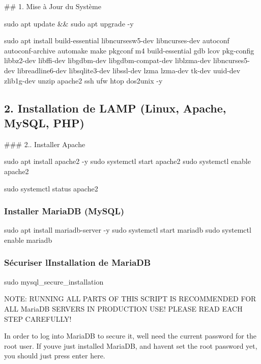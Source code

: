 \#\# 1. Mise à Jour du Système 
\begin{DoxyCode}
sudo apt update && sudo apt upgrade -y

sudo apt install build-essential libncursesw5-dev libncurses-dev autoconf autoconf-archive automake make
       pkgconf m4 build-essential gdb lcov pkg-config   libbz2-dev libffi-dev libgdbm-dev libgdbm-compat-dev
       liblzma-dev   libncurses5-dev libreadline6-dev libsqlite3-dev libssl-dev  lzma lzma-dev tk-dev uuid-dev zlib1g-dev
       unzip apache2 ssh ufw htop dos2unix -y
\end{DoxyCode}


\subsection*{2. Installation de L\+A\+MP (Linux, Apache, My\+S\+QL, P\+HP)}

\#\#\# 2.. Installer Apache 
\begin{DoxyCode}
sudo apt install apache2 -y
sudo systemctl start apache2
sudo systemctl enable apache2

sudo systemctl status apache2
\end{DoxyCode}


\subsubsection*{Installer Maria\+DB (My\+S\+QL)}


\begin{DoxyCode}
sudo apt install mariadb-server -y
sudo systemctl start mariadb
sudo systemctl enable mariadb
\end{DoxyCode}


\subsubsection*{Sécuriser l\textquotesingle{}Installation de Maria\+DB}


\begin{DoxyCode}
sudo mysql\_secure\_installation
\end{DoxyCode}


N\+O\+TE\+: R\+U\+N\+N\+I\+NG A\+LL P\+A\+R\+TS OF T\+H\+IS S\+C\+R\+I\+PT IS R\+E\+C\+O\+M\+M\+E\+N\+D\+ED F\+OR A\+LL Maria\+DB S\+E\+R\+V\+E\+RS IN P\+R\+O\+D\+U\+C\+T\+I\+ON U\+S\+E! P\+L\+E\+A\+SE R\+E\+AD E\+A\+CH S\+T\+EP C\+A\+R\+E\+F\+U\+L\+L\+Y!

In order to log into Maria\+DB to secure it, we\textquotesingle{}ll need the current password for the root user. If you\textquotesingle{}ve just installed Maria\+DB, and haven\textquotesingle{}t set the root password yet, you should just press enter here.


